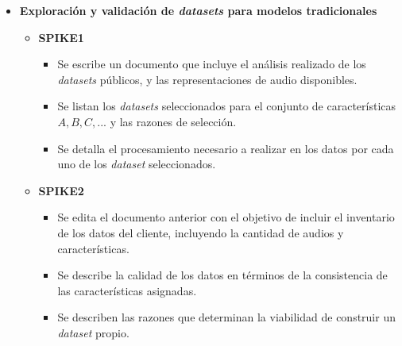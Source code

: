 \documentclass[
11pt, %
]{charter}
\begin{document}
\begin{itemize}
  \item \textbf{Exploración y validación de \textit{datasets} para modelos tradicionales}
    \begin{itemize}
      \item \textbf{SPIKE1}
      \begin{itemize}
        \item Se escribe un documento que incluye el análisis realizado de los \textit{datasets} públicos, y las representaciones de audio disponibles.
      \item Se listan los \textit{datasets} seleccionados para el conjunto de características ${A, B, C, ...}$ y las razones de selección.
        \item Se detalla el procesamiento necesario a realizar en los datos por cada uno de los \textit{dataset} seleccionados.
      \end{itemize}
      \item \textbf{SPIKE2}
      \begin{itemize}
        \item Se edita el documento anterior con el objetivo de incluir el inventario de los datos del cliente, incluyendo la cantidad de audios y características.
        \item Se describe la calidad de los datos en términos de la consistencia de las características asignadas.
        \item Se describen las razones que determinan la viabilidad de construir un \textit{dataset} propio.
      \end{itemize}
    \end{itemize}


\end{itemize}
\end{document}
